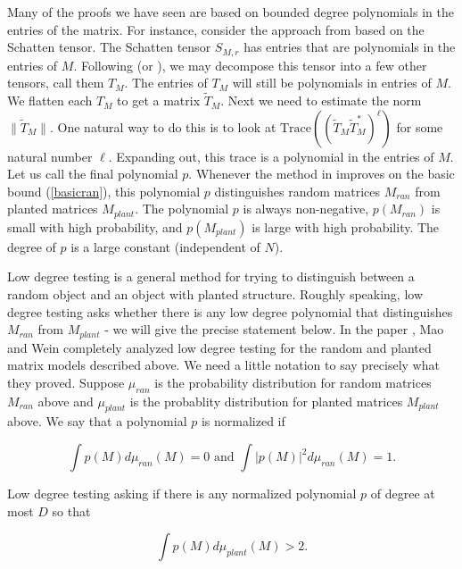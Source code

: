 \documentclass{amsart}
\newcommand{\tr}{\textrm{Trace}}
\begin{document}
Many of the proofs we have seen are based on bounded degree polynomials in the entries of the matrix.   For instance,  consider the approach from \cite{DHPT} based on the Schatten tensor.   The Schatten tensor $S_{M, r}$ has entries that are polynomials in the entries of $M$.    Following \cite{DHPT} (or \cite{GM}),  we may decompose this tensor into a few other tensors,  call them $T_M$.    The entries of $T_M$ will still be polynomials in entries of $M$.   We flatten each $T_M$ to get a matrix $\tilde T_M$.   Next we need to estimate the norm $\| \tilde T_M \|$.   One natural way to do this is to look at $\tr  \left( ( \tilde T_M \tilde T_M^*)^\ell \right)$ for some natural number $\ell$.   Expanding out,  this trace is a polynomial in the entries of $M$.   Let us call the final polynomial $p$.    Whenever the method in \cite{DHPT} improves on the basic bound (\ref{basicran}),  this polynomial $p$ distinguishes random matrices $M_{ran}$ from planted matrices $M_{plant}$.    The polynomial $p$ is always non-negative,  $p(M_{ran})$ is small with high probability, and $p(M_{plant})$ is large with high probability.    The degree of $p$ is a large constant (independent of $N$). 

Low degree testing is a general method for trying to distinguish between a random object and an object with planted structure.   Roughly speaking,  low degree testing
asks whether there is any low degree polynomial that distinguishes $M_{ran}$ from $M_{plant}$ - we will give the precise statement below.   In the paper \cite{MW},  Mao and Wein completely analyzed low degree testing for the random and planted matrix models described above.  We need a little notation to say precisely what they proved.   Suppose $\mu_{ran}$ is the probability distribution for random matrices $M_{ran}$ above and $\mu_{plant}$ is the probablity distribution for planted matrices $M_{plant}$ above.    We say that a polynomial $p$ is normalized if

\begin{equation} \label{lowdegnorm}
\int p(M) d \mu_{ran}(M) = 0 \textrm{ and } \int |p(M)|^2 d \mu_{ran}(M) = 1.
\end{equation}

Low degree testing asking if there is any normalized polynomial $p$ of degree at most $D$ so that

\begin{equation} \label{lowdegtest}
 \int p(M) d \mu_{plant}(M) > 2.
\end{equation}
\end{document}

